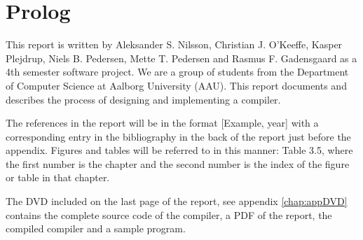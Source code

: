 \chapter{Prolog}
This report is written by Aleksander S. Nilsson, Christian J. O'Keeffe, Kasper Plejdrup, Niels  B. Pedersen, Mette T. Pedersen and Rasmus F. Gadensgaard as a 4th semester software project. We are a group of students from the Department of Computer Science at Aalborg University (AAU). This report documents and describes the process of designing and implementing a compiler.

The references in the report will be in the format [Example, year] with a corresponding entry in the bibliography in the back of the report just before the appendix. Figures and tables will be referred to in this manner: Table 3.5, where the first number is the chapter and the second number is the index of the figure or table in that chapter.

The DVD included on the last page of the report, see appendix \ref{chap:appDVD} contains the complete source code of the compiler, a PDF of the report, the compiled compiler and a sample program.
